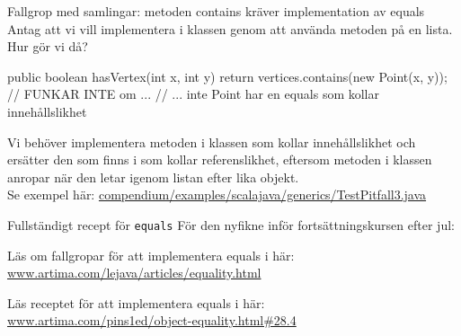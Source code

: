 \begin{Slide}{Fallgrop med samlingar: metoden contains kräver implementation av equals}\SlideFontSmall
Antag att vi vill implementera  i klassen  genom att använda metoden  på en lista. Hur gör vi då?
\pause
\begin{Code}[numberstyle=,language=Java]
public boolean hasVertex(int x, int y) {
    return vertices.contains(new Point(x, y)); // FUNKAR INTE om ...
    // ... inte Point har en equals som kollar innehållslikhet
}
\end{Code}
Vi behöver implementera metoden  i klassen  som kollar innehållslikhet och ersätter den  som finns i  som kollar referenslikhet, eftersom metoden  i klassen  anropar  när den letar igenom listan efter lika objekt. \\
Se exempel här: \href{https://github.com/lunduniversity/introprog/tree/master/compendium/examples/scalajava/generics/TestPitfall3.java}{compendium/examples/scalajava/generics/TestPitfall3.java} \\


\end{Slide}


\begin{Slide}{Fullständigt recept för \texttt{equals}}
För den nyfikne inför fortsättningskursen efter jul: 

\vspace{1em}\noindent
Läs om fallgropar för att implementera equals i  här: \\
\href{http://www.artima.com/lejava/articles/equality.html}{www.artima.com/lejava/articles/equality.html}


\vspace{1em}\noindent
Läs receptet för att implementera equals i  här: \\
\href{http://www.artima.com/pins1ed/object-equality.html#28.4}{www.artima.com/pins1ed/object-equality.html\#28.4}
\end{Slide}




